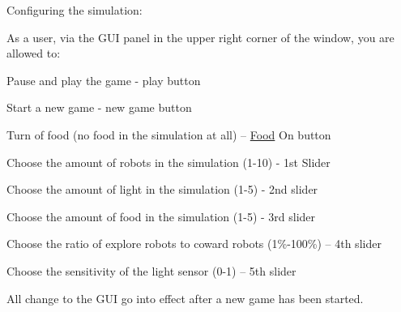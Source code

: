 Configuring the simulation\+:

As a user, via the G\+UI panel in the upper right corner of the window, you are allowed to\+:


\begin{DoxyItemize}
\item Pause and play the game -\/ play button
\item Start a new game -\/ new game button
\item Turn of food (no food in the simulation at all) – \mbox{\hyperlink{class_food}{Food}} On button
\item Choose the amount of robots in the simulation (1-\/10) -\/ 1st Slider
\item Choose the amount of light in the simulation (1-\/5) -\/ 2nd slider
\item Choose the amount of food in the simulation (1-\/5) -\/ 3rd slider
\item Choose the ratio of explore robots to coward robots (1\%-\/100\%) – 4th slider
\item Choose the sensitivity of the light sensor (0-\/1) – 5th slider
\end{DoxyItemize}

All change to the G\+UI go into effect after a new game has been started. 